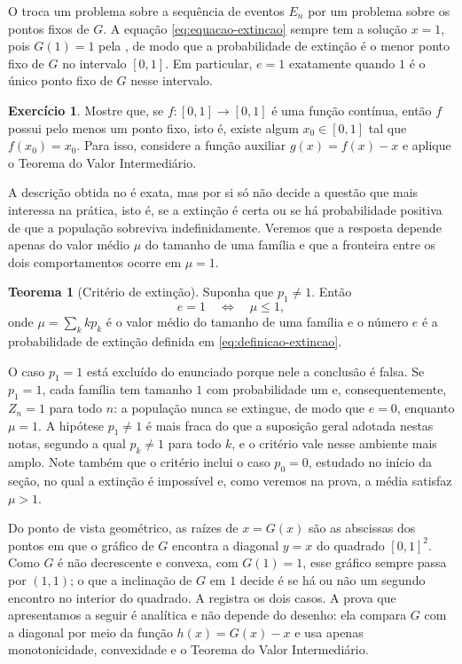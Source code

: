 \documentclass[12pt,portuguese]{article}
\theoremstyle{definition}
\newtheorem{theorem}{Teorema}
\theoremstyle{plainexercise}
\newtheorem{exercise}{Exercício}
\theoremstyle{starredexercise}
\theoremstyle{definition}
\begin{document}
O  troca um problema sobre a sequência de eventos
$E_n$ por um problema sobre os pontos fixos de $G$. A equação
\eqref{eq:equacao-extincao} sempre tem a solução $x=1$, pois $G(1)=1$ pela
, de modo que a probabilidade de extinção é o menor
ponto fixo de $G$ no intervalo $[0,1]$. Em particular, $e=1$ exatamente
quando $1$ é o único ponto fixo de $G$ nesse intervalo.

\begin{exercise}\label{exercise:ponto-fixo-intervalo}
Mostre que, se $f:[0,1]\to [0,1]$ é uma função contínua, então $f$ possui
pelo menos um ponto fixo, isto é, existe algum $x_0\in [0,1]$ tal que
$f(x_0)=x_0$. Para isso, considere a função auxiliar $g(x)=f(x)-x$ e aplique o
Teorema do Valor Intermediário.
\end{exercise}


\bigskip

A descrição obtida no  é exata, mas por si só não decide a questão
que mais interessa na prática, isto é,
se a extinção é certa ou se há probabilidade positiva de que a população
sobreviva indefinidamente. Veremos que a resposta depende
apenas do valor médio $\mu$ do tamanho de uma família e que a fronteira entre os dois
comportamentos ocorre em $\mu=1$.

\begin{theorem}[Critério de extinção]\label{thm:extincao-criterio}
Suponha que $p_1\neq1$. Então
\[
e=1
\quad \Longleftrightarrow \quad
\mu\leqslant1,
\]
onde $\mu=\sum_{k}kp_k$ é o valor médio do tamanho de uma família e o número $e$ é a
probabilidade de extinção definida em \eqref{eq:definicao-extincao}.
\end{theorem}

O caso $p_1=1$ está excluído do enunciado porque nele a conclusão é falsa. Se
$p_1=1$, cada família tem tamanho $1$ com probabilidade um e,
consequentemente, $Z_n=1$ para todo $n$: a população nunca se extingue, de modo
que $e=0$, enquanto $\mu=1$. A hipótese $p_1\neq1$ é mais fraca do que a
suposição geral adotada nestas notas, segundo a qual $p_k\neq1$ para todo $k$,
e o critério vale nesse ambiente mais amplo. Note também que o critério inclui
o caso $p_0=0$, estudado no início da seção, no qual a extinção é impossível e,
como veremos na prova, a média satisfaz $\mu>1$.

Do ponto de vista geométrico, as raízes de $x=G(x)$ são as abscissas dos pontos
em que o gráfico de $G$ encontra a diagonal $y=x$ do quadrado $[0,1]^{2}$. Como
$G$ é não decrescente e convexa, com $G(1)=1$, esse gráfico sempre passa por
$(1,1)$; o que a inclinação de $G$ em $1$ decide é se há ou não um segundo
encontro no interior do quadrado. A  registra os dois
casos. A prova que apresentamos a seguir é analítica e não depende do desenho:
ela compara $G$ com a diagonal por meio da função $h(x)=G(x)-x$ e usa apenas
monotonicidade, convexidade e o Teorema do Valor Intermediário.
\end{document}
